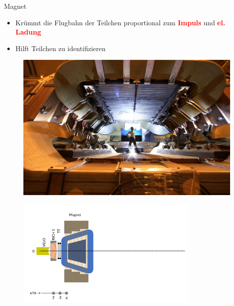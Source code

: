 \begin{frame}{Magnet}
    \begin{minipage}{0.58\textwidth}
    \begin{itemize}
        \item Krümmt die Flugbahn der Teilchen proportional zum \textcolor{red}{\textbf{Impuls}} und \textcolor{red}{\textbf{el. Ladung}} 
        \item Hilft Teilchen zu identifizieren %
    \end{itemize}
    \end{minipage}\hfill
    \begin{minipage}{0.38\textwidth}
        \begin{figure}[h]
        \centering
        \includegraphics[height=2.5 cm]{Figures Introductory Lecture/LHCb Detector/LHCb_Magnet.jpg}%
        \end{figure}
    \end{minipage}
    \vspace{-0.5cm}
    \begin{figure}[h]
    \centering
    \includegraphics[width=0.8\textwidth]{Figures Introductory Lecture/LHCb Detector/LHCb_4_DE.png}
    \end{figure}
\end{frame}
